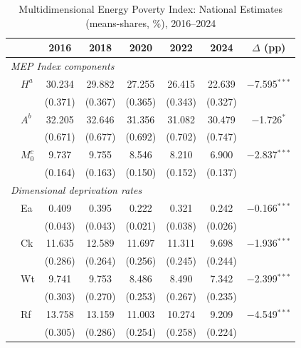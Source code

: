 \documentclass[11pt, a4paper]{article}
\begin{document}
\begin{table}[htbp]
\centering
\caption{Multidimensional Energy Poverty Index: National Estimates (means-shares, \%), 2016--2024}
\small
\begin{tabularx}{\textwidth}{l X cccccc}
\toprule
\toprule
 & & 2016 & 2018 & 2020 & 2022 & 2024 & $\Delta$ (pp) \\ \midrule
\multicolumn{7}{l}{\textit{MEP Index components}} \\[2pt]
& $H^a$ & 30.234 & 29.882 & 27.255 & 26.415 & 22.639 & $-$7.595$^{***}$ \\
&        & {\footnotesize (0.371)} & {\footnotesize (0.367)} & {\footnotesize (0.365)} & {\footnotesize (0.343)} & {\footnotesize (0.327)} & \\[2pt]
& $A^b$ & 32.205 & 32.646 & 31.356 & 31.082 & 30.479 & $-$1.726$^{*}$ \\
&        & {\footnotesize (0.671)} & {\footnotesize (0.677)} & {\footnotesize (0.692)} & {\footnotesize (0.702)} & {\footnotesize (0.747)} & \\[2pt]
& $M_0^c$ & 9.737 & 9.755 & 8.546 & 8.210 & 6.900 & $-$2.837$^{***}$ \\
&          & {\footnotesize (0.164)} & {\footnotesize (0.163)} & {\footnotesize (0.150)} & {\footnotesize (0.152)} & {\footnotesize (0.137)} & \\[4pt]
\multicolumn{7}{l}{\textit{Dimensional deprivation rates}} \\[2pt]
& Ea & 0.409 & 0.395 & 0.222 & 0.321 & 0.242 & $-$0.166$^{***}$ \\
&    & {\footnotesize (0.043)} & {\footnotesize (0.043)} & {\footnotesize (0.021)} & {\footnotesize (0.038)} & {\footnotesize (0.026)} & \\
& Ck & 11.635 & 12.589 & 11.697 & 11.311 & 9.698 & $-$1.936$^{***}$ \\
&    & {\footnotesize (0.286)} & {\footnotesize (0.264)} & {\footnotesize (0.256)} & {\footnotesize (0.245)} & {\footnotesize (0.244)} & \\
& Wt & 9.741 & 9.753 & 8.486 & 8.490 & 7.342 & $-$2.399$^{***}$ \\
&    & {\footnotesize (0.303)} & {\footnotesize (0.270)} & {\footnotesize (0.253)} & {\footnotesize (0.267)} & {\footnotesize (0.235)} & \\
& Rf & 13.758 & 13.159 & 11.003 & 10.274 & 9.209 & $-$4.549$^{***}$ \\
&    & {\footnotesize (0.305)} & {\footnotesize (0.286)} & {\footnotesize (0.254)} & {\footnotesize (0.258)} & {\footnotesize (0.224)} & \\

\end{tabularx}
\end{table}
\end{document}
